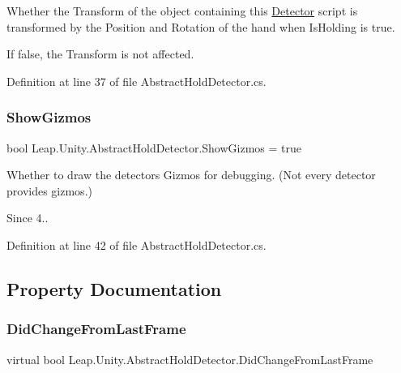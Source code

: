 Whether the Transform of the object containing this \mbox{\hyperlink{class_leap_1_1_unity_1_1_detector}{Detector}} script is transformed by the Position and Rotation of the hand when Is\+Holding is true.

If false, the Transform is not affected. 

Definition at line 37 of file Abstract\+Hold\+Detector.\+cs.

\mbox{\label{class_leap_1_1_unity_1_1_abstract_hold_detector_a7dfb2c84323d68f8ab583deaec8bcef2}} 
\subsubsection{\texorpdfstring{ShowGizmos}{ShowGizmos}}
{\footnotesize\ttfamily bool Leap.\+Unity.\+Abstract\+Hold\+Detector.\+Show\+Gizmos = true}

Whether to draw the detector\textquotesingle{}s Gizmos for debugging. (Not every detector provides gizmos.) \begin{DoxySince}{Since}
4.. 
\end{DoxySince}


Definition at line 42 of file Abstract\+Hold\+Detector.\+cs.



\subsection{Property Documentation}
\mbox{\label{class_leap_1_1_unity_1_1_abstract_hold_detector_acc454a423b49d479417b6cbacbfbe58f}} 
\subsubsection{\texorpdfstring{DidChangeFromLastFrame}{DidChangeFromLastFrame}}
{\footnotesize\ttfamily virtual bool Leap.\+Unity.\+Abstract\+Hold\+Detector.\+Did\+Change\+From\+Last\+Frame\hspace{0.3cm}{\ttfamily [get]}}



